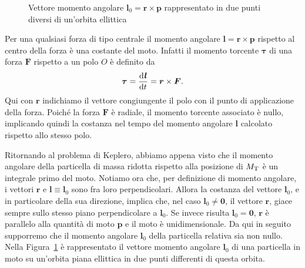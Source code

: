 \begin{figure}
  \caption[Vettore momento angolare]{Vettore momento angolare
    $\bm{l}_0 = \bm{r} \times \bm{p}$ rappresentato in due punti diversi
    di un'orbita ellittica}
  \label{fig:momento-angolare}
\end{figure}
Per una qualsiasi forza di tipo centrale il momento angolare $\bm{l} = \bm{r}
\times \bm{p}$ rispetto al centro della forza è una costante del moto. Infatti
il momento torcente $\bm{\tau}$ di una forza $\bm{F}$ rispetto a un polo $O$ è
definito da
\begin{equation}
  \bm{\tau}= \frac{{\mathop{}\!\mathrm{d}^{}}\bm{l}}{\mathop{}\!\mathrm{d} {t}^{}} = \bm{r}\times\bm{F}.
\end{equation}
Qui con $\bm{r}$ indichiamo il vettore congiungente il polo con il punto di
applicazione della forza. Poiché la forza $\bm{F}$ è radiale, il momento
torcente associato è nullo, implicando quindi la costanza nel tempo del momento
angolare $\bm{l}$ calcolato rispetto allo stesso polo.

Ritornando al problema di Keplero, abbiamo appena visto che il momento angolare
della particella di massa ridotta rispetto alla posizione di $M_\textup{T}$ è un
integrale primo del moto. Notiamo ora che, per definizione di momento angolare,
i vettori $\bm{r}$ e $\bm{l}\equiv\bm{l}_0$ sono fra loro perpendicolari. Allora
la costanza del vettore $\bm{l}_0$, e in particolare della sua direzione,
implica che, nel caso $\bm{l}_0\neq\bm{0}$, il vettore $\bm{r}$, giace sempre
sullo stesso piano perpendicolare a $\bm{l}_0$. Se invece risulta
$\bm{l}_0=\bm{0}$, $\bm{r}$ è parallelo alla quantità di moto $\bm{p}$ e il moto
è unidimensionale. Da qui in seguito supporremo che il momento angolare
$\bm{l}_0$ della particella relativa sia non nullo. Nella
Figura~\ref{fig:momento-angolare} è rappresentato il vettore momento angolare
$\bm{l}_0$ di una particella in moto su un'orbita piana ellittica in due punti
differenti di questa orbita.

